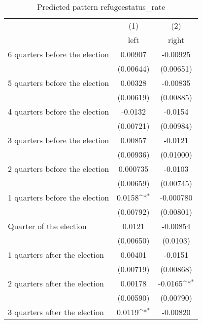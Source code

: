 \begin{table}[htbp]\centering
\def\sym#1{\ifmmode^{#1}\else\(^{#1}\)\fi}
\caption{Predicted pattern refugeestatus\_rate}
\begin{tabular}{l*{2}{c}}
\hline\hline
                    &\multicolumn{1}{c}{(1)}&\multicolumn{1}{c}{(2)}\\
                    &\multicolumn{1}{c}{left}&\multicolumn{1}{c}{right}\\
\hline
 6 quarters before the election&     0.00907         &    -0.00925         \\
                    &   (0.00644)         &   (0.00651)         \\
[1em]
 5 quarters before the election&     0.00328         &    -0.00835         \\
                    &   (0.00619)         &   (0.00885)         \\
[1em]
 4 quarters before the election&     -0.0132         &     -0.0154         \\
                    &   (0.00721)         &   (0.00984)         \\
[1em]
 3 quarters before the election&     0.00857         &     -0.0121         \\
                    &   (0.00936)         &   (0.01000)         \\
[1em]
 2 quarters before the election&    0.000735         &     -0.0103         \\
                    &   (0.00659)         &   (0.00745)         \\
[1em]
 1 quarters before the election&      0.0158\sym{*}  &   -0.000780         \\
                    &   (0.00792)         &   (0.00801)         \\
[1em]
Quarter of the election&      0.0121         &    -0.00854         \\
                    &   (0.00650)         &    (0.0103)         \\
[1em]
 1 quarters after the election&     0.00401         &     -0.0151         \\
                    &   (0.00719)         &   (0.00868)         \\
[1em]
 2 quarters after the election&     0.00178         &     -0.0165\sym{*}  \\
                    &   (0.00590)         &   (0.00790)         \\
[1em]
 3 quarters after the election&      0.0119\sym{*}  &    -0.00820         \\

\end{tabular}
\end{table}
